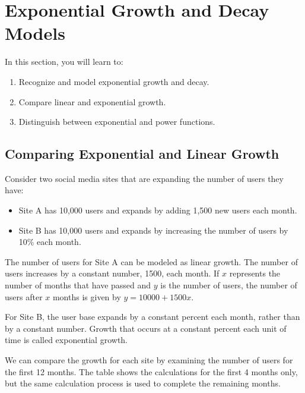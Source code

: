 \section{Exponential Growth and Decay Models}

In this section, you will learn to:
\begin{enumerate}
    \item Recognize and model exponential growth and decay.
    \item Compare linear and exponential growth.
    \item Distinguish between exponential and power functions.
\end{enumerate}

\subsection{Comparing Exponential and Linear Growth}

Consider two social media sites that are expanding the number of users they have:
\begin{itemize}
    \item Site A has 10,000 users and expands by adding 1,500 new users each month.
    \item Site B has 10,000 users and expands by increasing the number of users by 10\% each month.
\end{itemize}

The number of users for Site A can be modeled as linear growth. The number of users increases by a constant number, 1500, each month. If \( x \) represents the number of months that have passed and \( y \) is the number of users, the number of users after \( x \) months is given by \( y = 10000 + 1500x \).

For Site B, the user base expands by a constant percent each month, rather than by a constant number. Growth that occurs at a constant percent each unit of time is called exponential growth.

We can compare the growth for each site by examining the number of users for the first 12 months. The table shows the calculations for the first 4 months only, but the same calculation process is used to complete the remaining months.

